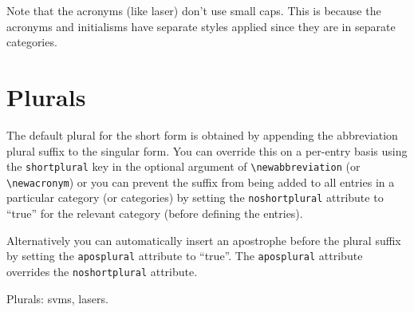 \documentclass{report}
\begin{document}
Note that the acronyms (like \gls{laser}) don't use small caps.
This is because the acronyms and initialisms have separate styles
applied since they are in separate categories.

\section{Plurals}

The default plural for the short form is obtained by appending
the abbreviation plural suffix to the singular form. You can
override this on a per-entry basis using the \texttt{shortplural}
key in the optional argument of \verb|\newabbreviation|
(or \verb|\newacronym|) or you can prevent the suffix from
being added to all entries in a particular category (or categories)
by setting the \texttt{noshortplural} attribute to ``true'' for
the relevant category (before defining the entries).

Alternatively you can automatically insert an apostrophe before 
the plural suffix by setting the \texttt{aposplural} attribute to 
``true''. The \texttt{aposplural} attribute overrides the
\texttt{noshortplural} attribute.

Plurals: \glspl{svm}, \glspl{laser}.

\printglossaries
\end{document}
